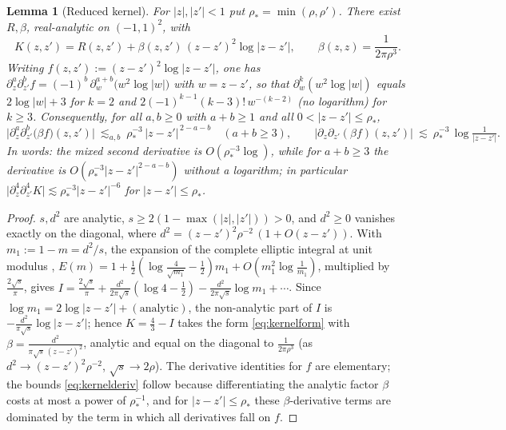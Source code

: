 \documentclass[11pt,reqno]{amsart}
\newtheorem{lemma}[theorem]{Lemma}
\theoremstyle{definition}
\newcommand{\abs}[1]{\lvert #1\rvert}
\newcommand{\rp}{\rho}
\newcommand{\lesss}{\lesssim}
\begin{document}
\begin{lemma}[Reduced kernel]\label{lem:kernel}
For $\abs z,\abs{z'}<1$ put $\rp_\ast=\min(\rp,\rp')$. There exist $R,\beta$, real-analytic on
$(-1,1)^2$, with
\begin{equation}\label{eq:kernelform}
   K(z,z')=R(z,z')+\beta(z,z')\,(z-z')^2\log\abs{z-z'},\qquad \beta(z,z)=\frac{1}{2\pi\rp^{3}} .
\end{equation}
Writing $f(z,z'):=(z-z')^2\log\abs{z-z'}$, one has $\partial_z^a\partial_{z'}^b f=(-1)^b\,\partial_w^{a+b}\!\bigl(w^2\log\abs w\bigr)$
with $w=z-z'$, so that $\partial_w^{k}(w^2\log\abs w)$ equals $2\log\abs w+3$ for $k=2$ and
$2(-1)^{k-1}(k-3)!\,w^{-(k-2)}$ (\emph{no} logarithm) for $k\ge3$. Consequently, for all $a,b\ge0$ with
$a+b\ge1$ and all $0<\abs{z-z'}\le\rp_\ast$,
\begin{equation}\label{eq:kernelderiv}
   \bigl\lvert\partial_z^{a}\partial_{z'}^{b}\bigl(\beta f\bigr)(z,z')\bigr\rvert
   \ \lesss_{a,b}\ \rp_\ast^{-3}\,\abs{z-z'}^{\,2-a-b}\quad(a+b\ge3),
   \qquad
   \bigl\lvert\partial_z\partial_{z'}(\beta f)(z,z')\bigr\rvert\ \lesss\ \rp_\ast^{-3}\,\log\tfrac1{\abs{z-z'}} .
\end{equation}
In words: the mixed second derivative is $O(\rp_\ast^{-3}\log)$, while for $a+b\ge3$ the derivative is
$O(\rp_\ast^{-3}\abs{z-z'}^{2-a-b})$ \emph{without} a logarithm; in particular
$\lvert\partial_z^4\partial_{z'}^4 K\rvert\lesss\rp_\ast^{-3}\abs{z-z'}^{-6}$ for $\abs{z-z'}\le\rp_\ast$.
\end{lemma}

\begin{proof}
$s,d^2$ are analytic, $s\ge2(1-\max(\abs z,\abs{z'}))>0$, and $d^2\ge0$ vanishes exactly on the
diagonal, where $d^2=(z-z')^2\rp^{-2}\,(1+O(z-z'))$. With $m_1:=1-m=d^2/s$, the expansion of the
complete elliptic integral at unit modulus \cite[\S19.12]{DLMF},
$E(m)=1+\tfrac12(\log\tfrac{4}{\sqrt{m_1}}-\tfrac12)m_1+O(m_1^2\log\tfrac1{m_1})$, multiplied by
$\tfrac{2\sqrt s}{\pi}$, gives
$I=\tfrac{2\sqrt s}{\pi}+\tfrac{d^2}{2\pi\sqrt s}(\log4-\tfrac12)-\tfrac{d^2}{2\pi\sqrt s}\log m_1+\cdots$.
Since $\log m_1=2\log\abs{z-z'}+(\text{analytic})$, the non-analytic part of $I$ is
$-\tfrac{d^2}{\pi\sqrt s}\log\abs{z-z'}$; hence $K=\tfrac43-I$ takes the form \eqref{eq:kernelform} with
$\beta=\tfrac{d^2}{\pi\sqrt s\,(z-z')^2}$, analytic and equal on the diagonal to $\tfrac1{2\pi\rp^3}$
(as $d^2\to(z-z')^2\rp^{-2}$, $\sqrt s\to2\rp$). The derivative identities for $f$ are elementary; the
bounds \eqref{eq:kernelderiv} follow because differentiating the analytic factor $\beta$ costs at most a
power of $\rp_\ast^{-1}$, and for $\abs{z-z'}\le\rp_\ast$ these $\beta$-derivative terms are dominated by
the term in which all derivatives fall on $f$.
\end{proof}
\end{document}
